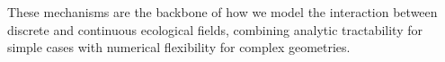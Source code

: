 These mechanisms are the backbone of how we model the interaction between discrete  and continuous ecological fields, combining analytic tractability for simple cases with numerical flexibility for complex geometries.













